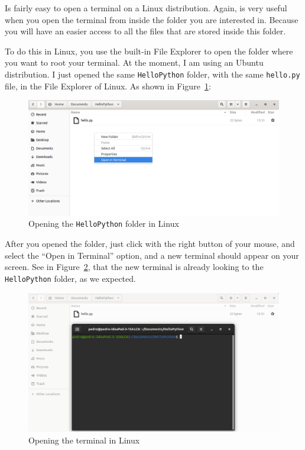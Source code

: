 \documentclass[
  11pt,
  letterpaper,
  DIV=11,
  numbers=noendperiod]{scrreprt}
\begin{document}
Is fairly easy to open a terminal on a Linux distribution. Again, is
very useful when you open the terminal from inside the folder you are
interested in. Because you will have an easier access to all the files
that are stored inside this folder.

To do this in Linux, you use the built-in File Explorer to open the
folder where you want to root your terminal. At the moment, I am using
an Ubuntu distribution. I just opened the same \texttt{HelloPython}
folder, with the same \texttt{hello.py} file, in the File Explorer of
Linux. As shown in Figure~\ref{fig-ubuntu-folder}:

\begin{figure}

{\centering \includegraphics{Chapters/../Figures/ubuntu-folder.png}

}

\caption{\label{fig-ubuntu-folder}Opening the \texttt{HelloPython}
folder in Linux}

\end{figure}

After you opened the folder, just click with the right button of your
mouse, and select the ``Open in Terminal'' option, and a new terminal
should appear on your screen. See in
Figure~\ref{fig-ubuntu-folder-terminal}, that the new terminal is
already looking to the \texttt{HelloPython} folder, as we expected.

\begin{figure}

{\centering \includegraphics{Chapters/../Figures/ubuntu-folder-terminal.png}

}

\caption{\label{fig-ubuntu-folder-terminal}Opening the terminal in
Linux}

\end{figure}
\end{document}
